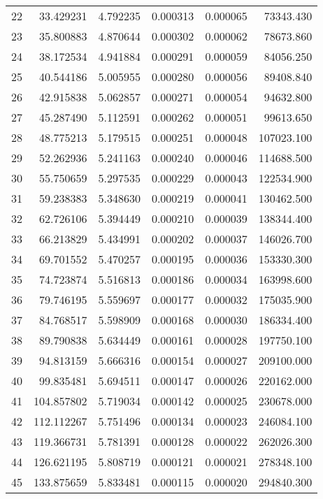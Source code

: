 \begin{tabular}{lrrrrr}
22 &    33.429231 &  4.792235 &  0.000313 &  0.000065 &    73343.430 \\
23 &    35.800883 &  4.870644 &  0.000302 &  0.000062 &    78673.860 \\
24 &    38.172534 &  4.941884 &  0.000291 &  0.000059 &    84056.250 \\
25 &    40.544186 &  5.005955 &  0.000280 &  0.000056 &    89408.840 \\
26 &    42.915838 &  5.062857 &  0.000271 &  0.000054 &    94632.800 \\
27 &    45.287490 &  5.112591 &  0.000262 &  0.000051 &    99613.650 \\
28 &    48.775213 &  5.179515 &  0.000251 &  0.000048 &   107023.100 \\
29 &    52.262936 &  5.241163 &  0.000240 &  0.000046 &   114688.500 \\
30 &    55.750659 &  5.297535 &  0.000229 &  0.000043 &   122534.900 \\
31 &    59.238383 &  5.348630 &  0.000219 &  0.000041 &   130462.500 \\
32 &    62.726106 &  5.394449 &  0.000210 &  0.000039 &   138344.400 \\
33 &    66.213829 &  5.434991 &  0.000202 &  0.000037 &   146026.700 \\
34 &    69.701552 &  5.470257 &  0.000195 &  0.000036 &   153330.300 \\
35 &    74.723874 &  5.516813 &  0.000186 &  0.000034 &   163998.600 \\
36 &    79.746195 &  5.559697 &  0.000177 &  0.000032 &   175035.900 \\
37 &    84.768517 &  5.598909 &  0.000168 &  0.000030 &   186334.400 \\
38 &    89.790838 &  5.634449 &  0.000161 &  0.000028 &   197750.100 \\
39 &    94.813159 &  5.666316 &  0.000154 &  0.000027 &   209100.000 \\
40 &    99.835481 &  5.694511 &  0.000147 &  0.000026 &   220162.000 \\
41 &   104.857802 &  5.719034 &  0.000142 &  0.000025 &   230678.000 \\
42 &   112.112267 &  5.751496 &  0.000134 &  0.000023 &   246084.100 \\
43 &   119.366731 &  5.781391 &  0.000128 &  0.000022 &   262026.300 \\
44 &   126.621195 &  5.808719 &  0.000121 &  0.000021 &   278348.100 \\
45 &   133.875659 &  5.833481 &  0.000115 &  0.000020 &   294840.300 \\

\end{tabular}
